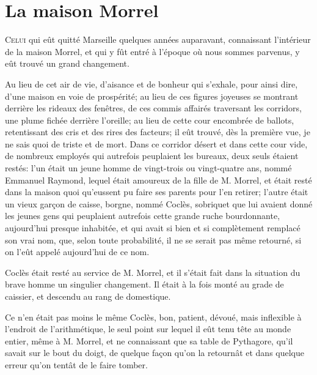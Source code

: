 \chapter{La maison Morrel}

\lettrine{C}{elui} qui eût quitté Marseille quelques années auparavant, connaissant l'intérieur de la maison Morrel, et qui y fût entré à l'époque où nous sommes parvenus, y eût trouvé un grand changement.

Au lieu de cet air de vie, d'aisance et de bonheur qui s'exhale, pour ainsi dire, d'une maison en voie de prospérité; au lieu de ces figures joyeuses se montrant derrière les rideaux des fenêtres, de ces commis affairés traversant les corridors, une plume fichée derrière l'oreille; au lieu de cette cour encombrée de ballots, retentissant des cris et des rires des facteurs; il eût trouvé, dès la première vue, je ne sais quoi de triste et de mort. Dans ce corridor désert et dans cette cour vide, de nombreux employés qui autrefois peuplaient les bureaux, deux seuls étaient restés: l'un était un jeune homme de vingt-trois ou vingt-quatre ans, nommé Emmanuel Raymond, lequel était amoureux de la fille de M. Morrel, et était resté dans la maison quoi qu'eussent pu faire ses parents pour l'en retirer; l'autre était un vieux garçon de caisse, borgne, nommé Coclès, sobriquet que lui avaient donné les jeunes gens qui peuplaient autrefois cette grande ruche bourdonnante, aujourd'hui presque inhabitée, et qui avait si bien et si complètement remplacé son vrai nom, que, selon toute probabilité, il ne se serait pas même retourné, si on l'eût appelé aujourd'hui de ce nom.

Coclès était resté au service de M. Morrel, et il s'était fait dans la situation du brave homme un singulier changement. Il était à la fois monté au grade de caissier, et descendu au rang de domestique.

Ce n'en était pas moins le même Coclès, bon, patient, dévoué, mais inflexible à l'endroit de l'arithmétique, le seul point sur lequel il eût tenu tête au monde entier, même à M. Morrel, et ne connaissant que sa table de Pythagore, qu'il savait sur le bout du doigt, de quelque façon qu'on la retournât et dans quelque erreur qu'on tentât de le faire tomber.

